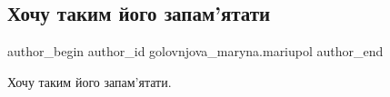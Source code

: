  
 
 
 
 

\subsection{Хочу таким його запам'ятати}
\label{sec:26_03_2022.fb.golovnjova_maryna.mariupol.1.khochu_takim_yogo_za}

\ifcmt
 author_begin
   author_id golovnjova_maryna.mariupol
 author_end
\fi

Хочу таким його запам'ятати.

